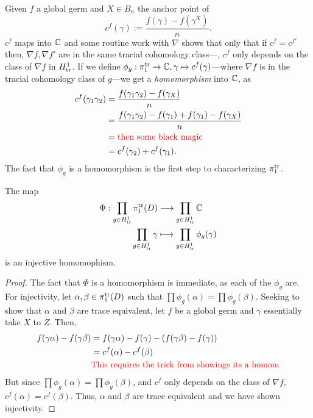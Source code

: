 Given \(f\) a global germ and \(X \in B_n\) the anchor point of
\[
  c^f(\gamma) := \frac{f(\gamma)-f(\gamma^X)}{n}.
\]
\(c^f\) maps into \(\mathbb{C} \) and some routine work with \(\nabla\) shows that
only that if \(c^f=c^{f'}\) then, \(\nabla f,\nabla f'\) are in the same tracial
cohomology class---\ie, \(c^f\) only depends on the class of \(\nabla f \) in
\(H^1_{\operatorname{tr}}\). If we define
\(\phi_g: \pi_1^{\operatorname{tr}}\to \mathbb{C} , \gamma \mapsto c^f(\gamma)\)---where \(\nabla f\)
is in the tracial cohomology class of \(g\)---we get a
\emph{homomorphism} into \(\mathbb{C} \), as
\begin{align*}
  c^f(\gamma_1\gamma_2) &= \frac{f(\gamma_1\gamma_2) - f(\gamma_X)}{n} \\
             &= \frac{f(\gamma_1\gamma_2) - f(\gamma_1) + f(\gamma_1) -f(\gamma_X)}{n} \\
             &= {\color{red} \text{then some black magic}} \\
             &= c^f(\gamma_2) + c^f(\gamma_1).
\end{align*}
The fact that \(\phi_g\) is a homomorphism is the first step to characterizing
\(\pi_1^{\operatorname{tr}}\).
\begin{lemma}
  The map
  \begin{align*}
	  \Phi: \prod_{g \in H^1_{\operatorname{tr}}} \pi_1^{\operatorname{tr}}(D) &\longrightarrow \prod_{g \in H^1_{\operatorname{tr}}}\mathbb{C}  \\
    \prod_{g \in H^1_{\operatorname{tr}}} \gamma &\longmapsto \prod_{g \in H^1_{\operatorname{tr}}} \phi_g(\gamma)
  \end{align*}
  is an injective homomophism.
\end{lemma}

\begin{proof}
  The fact that \(\Phi\) is a homomorphism is immediate, as each of the
  \(\phi_g\) are. For injectivity,
  let \(\alpha,\beta \in \pi_1^{\operatorname{tr}}(D)\) such that \(\prod\phi_g(\alpha)=\prod\phi_g(\beta)\). Seeking to show that
  \(\alpha\) and \(\beta\) are trace equivalent, let \(f\) be a global germ and
  \(\gamma\) essentially take \(X\) to \(Z\). Then,
  \begin{align*}
    f(\gamma\alpha)-f(\gamma\beta) &= f(\gamma\alpha) - f(\gamma) - \left( f(\gamma\beta)-f(\gamma) \right) \\
                &= c^f(\alpha) - c^f(\beta)\\
                & {\color{red} \text{This requires the trick from showings its a
                  homom}}
  \end{align*}
  But since \(\prod\phi_g(\alpha)=\prod\phi_g(\beta)\), and \(c^f\) only depends
  on the class of \(\nabla f\),
  \(c^f(\alpha) = c^f(\beta)\). Thus, \(\alpha\) and \(\beta\) are trace
  equivalent and we have shown injectivity.
\end{proof}

